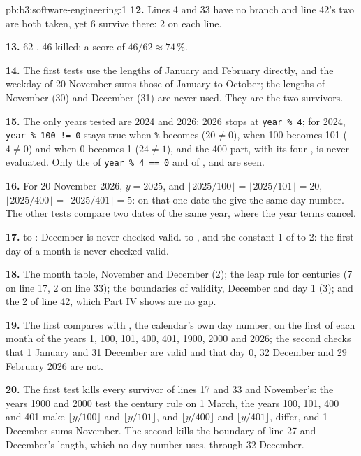 \begin{solution}{pb:b3:software-engineering:1}
\textbf{12.} Lines 4 and 33 have no branch and line 42's two are both taken, yet 6  survive there: 2 on each line.

\textbf{13.} 62 , 46 killed: a score of $46/62 \approx 74\,\%$.

\textbf{14.} The first tests use the lengths of January and February directly, and the weekday of 20 November sums those of January to October; the lengths of November (30) and December (31) are never used. They are the two survivors.

\textbf{15.} The only years tested are 2024 and 2026: 2026 stops at \texttt{year \% 4}; for 2024, \texttt{year \% 100 != 0} stays true when \texttt{\%} becomes \code{//} ($20 \ne 0$), when 100 becomes 101 ($4 \ne 0$) and when 0 becomes 1 ($24 \ne 1$), and the 400 part, with its four , is never evaluated. Only the  of \texttt{year \% 4 == 0} and of ,  and \code{!=} are seen.

\textbf{16.} For 20 November 2026, $y = 2025$, and $\lfloor 2025/100\rfloor = \lfloor 2025/101\rfloor = 20$, $\lfloor 2025/400\rfloor = \lfloor 2025/401\rfloor = 5$: on that one date the  give the same day number. The other tests compare two dates of the same year, where the year terms cancel.

\textbf{17.}  to : December is never checked valid.  to , and the constant 1 of  to 2: the first day of a month is never checked valid.

\textbf{18.} The month table, November and December (2); the leap rule for centuries (7 on line 17, 2 on line 33); the boundaries of validity, December and day 1 (3); and the 2  of line 42, which Part IV shows are no gap.

\textbf{19.} The first compares  with , the calendar's own day number, on the first of each month of the years 1, 100, 101, 400, 401, 1900, 2000 and 2026; the second checks that 1 January and 31 December are valid and that day 0, 32 December and 29 February 2026 are not.

\textbf{20.} The first test kills every survivor of lines 17 and 33 and November's: the years 1900 and 2000 test the century rule on 1 March, the years 100, 101, 400 and 401 make $\lfloor y/100 \rfloor$ and $\lfloor y/101 \rfloor$, and $\lfloor y/400 \rfloor$ and $\lfloor y/401 \rfloor$, differ, and 1 December sums November. The second kills the boundary  of line 27 and December's length, which no day number uses, through 32 December.


\end{solution}
